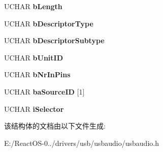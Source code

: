 \begin{DoxyCompactItemize}
\item 
\mbox{\label{struct_u_s_b___a_u_d_i_o___c_o_n_t_r_o_l___s_e_l_e_c_t_o_r___u_n_i_t___d_e_s_c_r_i_p_t_o_r_afaba5c84879acb6d18b7c4bdea9bb7e1}} 
U\+C\+H\+AR {\bfseries b\+Length}
\item 
\mbox{\label{struct_u_s_b___a_u_d_i_o___c_o_n_t_r_o_l___s_e_l_e_c_t_o_r___u_n_i_t___d_e_s_c_r_i_p_t_o_r_a3e583938df03a1b695a782489f0451d2}} 
U\+C\+H\+AR {\bfseries b\+Descriptor\+Type}
\item 
\mbox{\label{struct_u_s_b___a_u_d_i_o___c_o_n_t_r_o_l___s_e_l_e_c_t_o_r___u_n_i_t___d_e_s_c_r_i_p_t_o_r_ae3489fa897a4e147d67e1503e3e928b8}} 
U\+C\+H\+AR {\bfseries b\+Descriptor\+Subtype}
\item 
\mbox{\label{struct_u_s_b___a_u_d_i_o___c_o_n_t_r_o_l___s_e_l_e_c_t_o_r___u_n_i_t___d_e_s_c_r_i_p_t_o_r_a1fc6b5147d856304ae263a9980bb4f63}} 
U\+C\+H\+AR {\bfseries b\+Unit\+ID}
\item 
\mbox{\label{struct_u_s_b___a_u_d_i_o___c_o_n_t_r_o_l___s_e_l_e_c_t_o_r___u_n_i_t___d_e_s_c_r_i_p_t_o_r_a40898623a9437e0fdfc29ff9acddeedf}} 
U\+C\+H\+AR {\bfseries b\+Nr\+In\+Pins}
\item 
\mbox{\label{struct_u_s_b___a_u_d_i_o___c_o_n_t_r_o_l___s_e_l_e_c_t_o_r___u_n_i_t___d_e_s_c_r_i_p_t_o_r_a5eb5471c3fe09268bf38eef63d05672a}} 
U\+C\+H\+AR {\bfseries ba\+Source\+ID} \mbox{[}1\mbox{]}
\item 
\mbox{\label{struct_u_s_b___a_u_d_i_o___c_o_n_t_r_o_l___s_e_l_e_c_t_o_r___u_n_i_t___d_e_s_c_r_i_p_t_o_r_a72ee9a2a1c9f66cc10391ab977d35423}} 
U\+C\+H\+AR {\bfseries i\+Selector}
\end{DoxyCompactItemize}


该结构体的文档由以下文件生成\+:\begin{DoxyCompactItemize}
\item 
E\+:/\+React\+O\+S-\/0../drivers/usb/usbaudio/usbaudio.\+h\end{DoxyCompactItemize}
